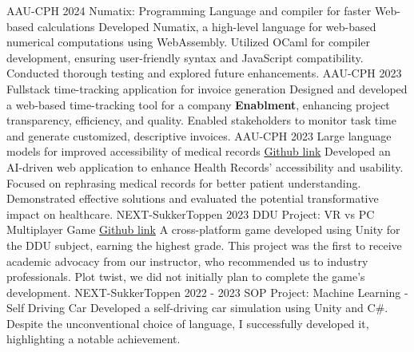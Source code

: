 \documentclass[9pt]{developercv} %
\begin{document}
\begin{entrylist}
	\entry
		{AAU-CPH 2024}
		{Numatix: Programming Language and compiler for faster Web-based calculations}
		{}
		{Developed Numatix, a high-level language for web-based numerical computations using WebAssembly. Utilized OCaml for compiler development, ensuring user-friendly syntax and JavaScript compatibility. Conducted thorough testing and explored future enhancements.}
    \entry
		{AAU-CPH 2023}
		{Fullstack time-tracking application for invoice generation}
		{}
		{Designed and developed a web-based time-tracking tool for a company \textbf{Enablment}, enhancing project transparency, efficiency, and quality. Enabled stakeholders to monitor task time and generate customized, descriptive invoices.}
   \entry
		{AAU-CPH 2023}
		{Large language models for improved accessibility of medical records}
		{\href{https://github.com/NicklasKleemann/2ndSemesterProject}{Github link}}
		{Developed an AI-driven web application to enhance Health Records' accessibility and usability. Focused on rephrasing medical records for better patient understanding. Demonstrated effective solutions and evaluated the potential transformative impact on healthcare.}
     \entry
		{NEXT-SukkerToppen 2023}
		{DDU Project: VR vs PC Multiplayer Game}
		{\href{https://github.com/Todua992/vrVSpc}{Github link}}
		{A cross-platform game developed using Unity for the DDU subject, earning the highest grade. This project was the first to receive academic advocacy from our instructor, who recommended us to industry professionals. Plot twist, we did not initially plan to complete the game's development.}
       \entry
		{NEXT-SukkerToppen 2022 - 2023}
		{SOP Project: Machine Learning - Self Driving Car}
		{}
		{Developed a self-driving car simulation using Unity and C\#. Despite the unconventional choice of language, I successfully developed it, highlighting a notable achievement.}
\end{entrylist}
\end{document}
